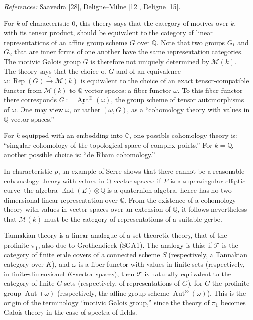 \documentclass[11pt,a4paper]{article}
\theoremstyle{plain}
\theoremstyle{definition}
\DeclareMathOperator{\Aut}{Aut}
\DeclareMathOperator{\End}{End}
\DeclareMathOperator{\Rep}{Rep}
\newcommand{\Q}{\mathbb{Q}}
\newcommand{\C}{\mathbb{C}}
\begin{document}
\textit{References:} Saavedra [28], Deligne--Milne [12], Deligne [15].

For $k$ of characteristic $0$, this theory says that the category of motives over $k$, with its tensor product, should be equivalent to the category of linear representations of an affine group scheme $G$ over $\Q$. Note that two groups $G_1$ and $G_2$ that are inner forms of one another have the same representation categories. The motivic Galois group $G$ is therefore not uniquely determined by $\mathcal{M}(k)$. The theory says that the choice of $G$ and of an equivalence $\omega:\Rep(G)\xrightarrow{\sim}\mathcal{M}(k)$ is equivalent to the choice of an exact tensor-compatible functor from $\mathcal{M}(k)$ to $\Q$-vector spaces: a fiber functor $\omega$. To this fiber functor there corresponds $G:=\underline{\Aut}^{\otimes}(\omega)$, the group scheme of tensor automorphisms of $\omega$. One may view $\omega$, or rather $(\omega,G)$, as a ``cohomology theory with values in $\Q$-vector spaces.''

For $k$ equipped with an embedding into $\C$, one possible cohomology theory is: ``singular cohomology of the topological space of complex points.'' For $k=\Q$, another possible choice is: ``de Rham cohomology.''

In characteristic $p$, an example of Serre shows that there cannot be a reasonable cohomology theory with values in $\Q$-vector spaces: if $E$ is a supersingular elliptic curve, the algebra $\End(E)\otimes\Q$ is a quaternion algebra, hence has no two-dimensional linear representation over $\Q$. From the existence of a cohomology theory with values in vector spaces over an extension of $\Q$, it follows nevertheless that $\mathcal{M}(k)$ must be the category of representations of a suitable gerbe.

Tannakian theory is a linear analogue of a set-theoretic theory, that of the profinite $\pi_1$, also due to Grothendieck (SGA1). The analogy is this: if $\mathcal{T}$ is the category of finite etale covers of a connected scheme $S$ (respectively, a Tannakian category over $K$), and $\omega$ is a fiber functor with values in finite sets (respectively, in finite-dimensional $K$-vector spaces), then $\mathcal{T}$ is naturally equivalent to the category of finite $G$-sets (respectively, of representations of $G$), for $G$ the profinite group $\Aut(\omega)$ (respectively, the affine group scheme $\underline{\Aut}^{\otimes}(\omega)$). This is the origin of the terminology ``motivic Galois group,'' since the theory of $\pi_1$ becomes Galois theory in the case of spectra of fields.
\end{document}
